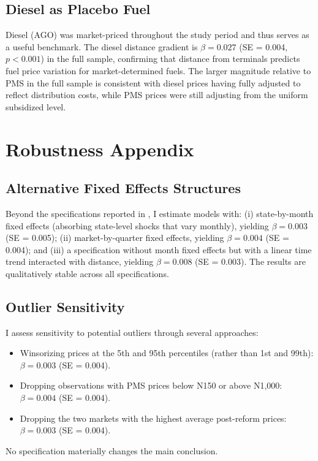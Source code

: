 \documentclass[12pt]{article}
\newcommand{\naira}{\textnigerian}
\renewcommand{\naira}{\mbox{\rlap{\hspace{0.09em}=}N}}
\begin{document}
\subsection{Diesel as Placebo Fuel}

Diesel (AGO) was market-priced throughout the study period and thus serves as a useful benchmark. The diesel distance gradient is $\beta = 0.027$ (SE = 0.004, $p < 0.001$) in the full sample, confirming that distance from terminals predicts fuel price variation for market-determined fuels. The larger magnitude relative to PMS in the full sample is consistent with diesel prices having fully adjusted to reflect distribution costs, while PMS prices were still adjusting from the uniform subsidized level.


\section{Robustness Appendix}
\label{app:robustness}

\subsection{Alternative Fixed Effects Structures}

Beyond the specifications reported in , I estimate models with: (i) state-by-month fixed effects (absorbing state-level shocks that vary monthly), yielding $\beta = 0.003$ (SE = 0.005); (ii) market-by-quarter fixed effects, yielding $\beta = 0.004$ (SE = 0.004); and (iii) a specification without month fixed effects but with a linear time trend interacted with distance, yielding $\beta = 0.008$ (SE = 0.003). The results are qualitatively stable across all specifications.

\subsection{Outlier Sensitivity}

I assess sensitivity to potential outliers through several approaches:
\begin{itemize}
    \item Winsorizing prices at the 5th and 95th percentiles (rather than 1st and 99th): $\beta = 0.003$ (SE = 0.004).
    \item Dropping observations with PMS prices below \naira{}150 or above \naira{}1,000: $\beta = 0.004$ (SE = 0.004).
    \item Dropping the two markets with the highest average post-reform prices: $\beta = 0.003$ (SE = 0.004).
\end{itemize}
No specification materially changes the main conclusion.
\end{document}
